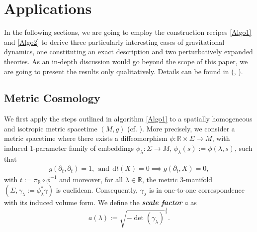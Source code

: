 \documentclass[%
preprint,
titlepage,
nofootinbib,
amsmath,amssymb,
showkeys,
aps,
prd,
floatfix,
]{revtex4-2}
\begin{document}
\section{Applications}\label{chapter4}
In the following sections, we are going to employ the construction recipes \ref{Algo1} and \ref{Algo2}
to derive three particularly interesting cases of gravitational dynamics, one constituting an  exact description and two perturbatively expanded theories.
As an in-depth discussion would go beyond the scope of this paper, we are going to present the results only qualitatively. Details can be found in (\cite{TobiMaster}, \cite{NilsPHD}).

\subsection{Metric Cosmology}
We first apply the steps outlined in algorithm \ref{Algo1} to a spatially homogeneous and isotropic metric
spacetime $(M, g)$ (cf. \cite{Wald}).
More precisely, we consider a metric spacetime where there exists a diffeomorphism $\phi : \mathbb{R} \times \Sigma \rightarrow M$, with induced $1$-parameter family of embeddings $\phi_{\lambda}: \Sigma \rightarrow M$, $\phi_{\lambda}(s):=\phi(\lambda,s)$, such that
\begin{align}
g(\partial_t, \partial_t) = 1, \ \  \text{and} \ \ \mathrm dt(X) = 0 \implies  g(\partial_t, X) = 0,   
\end{align}
with $t := \pi_{\mathbb{R}} \circ \phi^{-1}$ and moreover,
for all $\lambda \in \mathbb{R}$, the metric $3$-manifold $(\Sigma, \gamma_{\lambda}:= \phi_{\lambda}^{\ast} \gamma)$ is euclidean.
Consequently, $\gamma_{\lambda}$ is in one-to-one correspondence with its induced volume form. We define the \textbf{\textit{scale factor}} $a$ as
\begin{equation}
    a(\lambda) := \sqrt{-\operatorname{det}(\gamma_{\lambda})}^\frac{1}{3}.
\end{equation}
\end{document}
